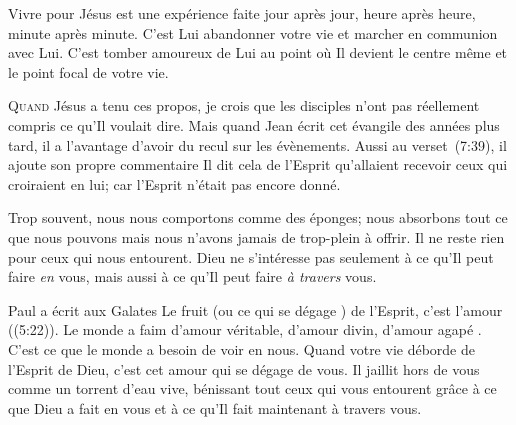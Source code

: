 Vivre pour Jésus est une expérience faite jour après jour,
 heure après heure, minute après minute.
 C'est Lui abandonner votre vie et marcher en communion avec Lui.
 C'est tomber amoureux de Lui au point où Il devient le centre même
 et le point focal de votre vie.

\dvrule






\lettrine{Q}{uand} Jésus a tenu ces propos,
 je crois que les disciples n'ont pas réellement compris
 ce qu'Il voulait dire. Mais quand Jean écrit cet évangile 
 des années plus tard, il a l'avantage d'avoir du recul sur les évènements.
 Aussi au verset~(7:39), il ajoute son propre commentaire\frcolon{}
 \Og Il dit cela de l'Esprit qu'allaient recevoir ceux qui croiraient en lui;
 car l'Esprit n'était pas encore donné. \Fg{}


Trop souvent, nous nous comportons comme des éponges;
 nous absorbons tout ce que nous pouvons mais nous n'avons jamais
 de trop-plein à offrir. Il ne reste rien pour ceux qui nous entourent.
 Dieu ne s'intéresse pas seulement à ce qu'Il peut faire \emph{en} vous,
 mais aussi à ce qu'Il peut faire \emph{à travers} vous.

Paul a écrit aux Galates\frcolon{} 
 \Og Le fruit (ou \Og ce qui se dégage \Fg{}) de l'Esprit,
 c'est l'amour \Fg{} ((5:22)).
 Le monde a faim d'amour véritable, d'amour divin, d'amour \Og agapé \Fg{}.
 C'est ce que le monde a besoin de voir en nous. Quand votre vie déborde
 de l'Esprit de Dieu, c'est cet amour qui se dégage de vous.
 Il jaillit hors de vous comme un torrent d'eau vive,
 bénissant tout ceux qui vous entourent grâce à ce que Dieu
 a fait en vous et à ce qu'Il fait maintenant à travers vous.

